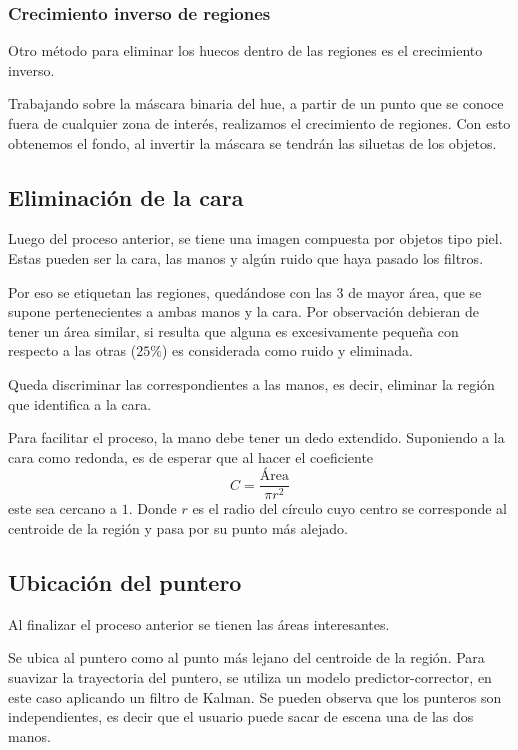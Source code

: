 \documentclass[conference,a4paper,10pt,oneside,final]{tfmpd}
\begin{document}
   		 \subsubsection{Crecimiento inverso de regiones}
			Otro método para eliminar los huecos dentro de las regiones es el crecimiento inverso.
   	
			Trabajando sobre la máscara binaria del hue,		 
   			 a partir de un punto que se conoce fuera de cualquier zona de interés,
			realizamos el crecimiento de regiones. Con esto obtenemos el fondo, 
			al invertir la máscara se tendrán las siluetas de los objetos.


    \subsection{Eliminación de la cara}
   		 Luego del proceso anterior, se tiene una imagen compuesta por objetos
   	 tipo piel. Estas pueden ser la cara, las manos y algún ruido que haya pasado los filtros.

   		 Por eso se etiquetan las regiones, quedándose con las $3$ de mayor área,
   	 que se supone pertenecientes a ambas manos y la cara.
   	 Por observación debieran de tener un área similar, si resulta que alguna
   		 es excesivamente pequeña con respecto a las otras ($25\%$) es considerada
   	 como ruido y eliminada.

   	 
   		 Queda discriminar las correspondientes a las manos,
   	 es decir, eliminar la región que identifica a la cara.

   	 Para facilitar el proceso, la mano debe tener un dedo extendido.
   	 Suponiendo a la cara como redonda, es de esperar que al hacer
   	 el coeficiente
   		 \[C = \frac{\mbox{Área}}{\pi r^2}\]
   	 este sea cercano a $1$. Donde $r$ es el radio del círculo cuyo centro
   	 se corresponde al centroide de la región y pasa por su punto más alejado.

    \subsection{Ubicación del puntero}
   	Al finalizar el proceso anterior se tienen las áreas interesantes.

   	 Se ubica al puntero como al punto más lejano del centroide de la región.
 Para suavizar la trayectoria del puntero, se utiliza un modelo predictor-corrector, en este caso aplicando un filtro de Kalman.
Se pueden observa que los punteros son independientes, es decir que el usuario puede sacar de escena  una de las dos manos.
\end{document}
